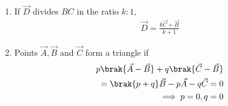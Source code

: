 \begin{enumerate}[label=\thesubsection.\arabic*.,ref=\thesubsection.\theenumi]
\item If $\vec{D}$ divides $BC$ in the ratio $k : 1$,
		\begin{align}
			\vec{D}= \frac{k\vec{C}+\vec{B}}{k+1}
	  \label{eq:section_formula-alg}
		\end{align}
  \item Points $\vec{A},\vec{B}$ and $\vec{C}$ form a triangle  if 
	  \label{prop:two-tri-indep}
  \begin{align}
	  p\brak{\vec{A}- \vec{B}} +q\brak{\vec{C} -\vec{B}} 
	  \\
	  =\brak{p+q}\vec{B}- p\vec{A} -q\vec{C} = 0
	  \\
	  \implies p=0, q=0
	  \label{eq:two-tri-indep}
  \end{align}
\end{enumerate}

